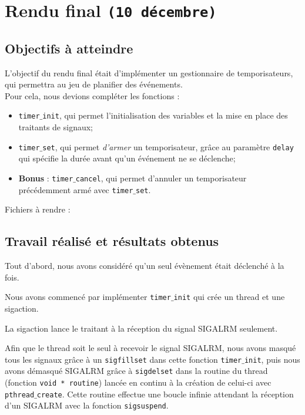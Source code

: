\documentclass[a4paper, 12pt]{article}
\begin{document}
\newpage
\section{Rendu final \texttt{(10 décembre)}}
	\subsection{Objectifs à atteindre}
	L'objectif du rendu final était d'implémenter un gestionnaire de temporisateurs, qui permettra au jeu de planifier des événements. \\
	Pour cela, nous devions compléter les fonctions :
\begin{itemize}
	 \item \texttt{timer$\_$init}, qui permet l'initialisation des variables et la mise en place des traitants de signaux;
	 \item \texttt{timer$\_$set}, qui permet \textit{d'armer} un temporisateur, grâce au paramètre \texttt{delay} qui spécifie la durée avant qu'un événement ne se déclenche; \\
	 \item \textbf{Bonus} : \texttt{timer$\_$cancel}, qui permet d'annuler un temporisateur précédemment armé avec \texttt{timer$\_$set}. \\
\end{itemize}

	Fichiers à rendre :
	
	

	\subsection{Travail réalisé et résultats obtenus} 
	Tout d'abord, nous avons considéré qu'un seul évènement était déclenché à la fois.
	
	Nous avons commencé par implémenter \texttt{timer$\_$init} qui crée un thread et une sigaction.
	
	La sigaction lance le traitant à la réception du signal SIGALRM seulement.
	
	Afin que le thread soit le seul à recevoir le signal SIGALRM, nous avons masqué tous les signaux grâce à un \texttt{sigfillset} dans cette fonction \texttt{timer$\_$init}, puis nous avons démasqué SIGALRM grâce à \texttt{sigdelset} dans la routine du thread (fonction \texttt{void * routine}) lancée en continu à la création de celui-ci avec \texttt{pthread$\_$create}. Cette routine effectue une boucle infinie attendant la réception d'un SIGALRM avec la fonction \texttt{sigsuspend}. 
	
\end{document}
